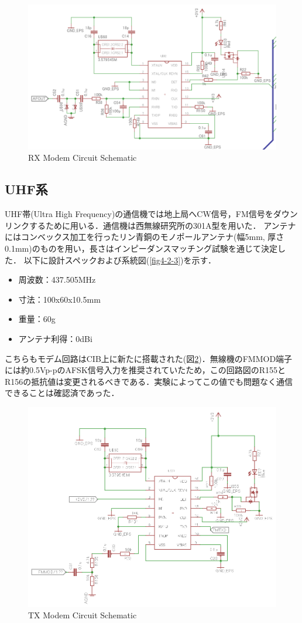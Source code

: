 \begin{figure}[htbp]
	\centering
	\includegraphics[width=0.7\linewidth]{03/fig/4-2-rx_modem.PNG}
	\caption{RX Modem Circuit Schematic}
	\label{fig4-4-2-rx_m}
\end{figure}



\subsection{UHF系}
UHF帯(Ultra High Frequency)の通信機では地上局へCW信号，FM信号をダウンリンクするために用いる．通信機は西無線研究所の301A型を用いた．
アンテナにはコンベックス加工を行ったリン青銅のモノポールアンテナ(幅5mm, 厚さ0.1mm)のものを用い，長さはインピーダンスマッチング試験を通じて決定した．
以下に設計スペックおよび系統図(\ref{fig4-2-3})を示す．
\begin{itemize}
	\item 周波数：437.505MHz
	\item 寸法：100x60x10.5mm
	\item 重量：60g
	\item アンテナ利得：0dBi
\end{itemize}




こちらもモデム回路はCIB上に新たに搭載された(図\ref{fig4-4-2-tx_m})．無線機のFMMOD端子には約0.5Vp-pのAFSK信号入力を推奨されていたため，この回路図のR155とR156の抵抗値は変更されるべきである．実験によってこの値でも問題なく通信できることは確認済であった．



\begin{figure}[htbp]
	\centering
	\includegraphics[width=0.7\linewidth]{03/fig/4-2-tx_modem.PNG}
	\caption{TX Modem Circuit Schematic}
	\label{fig4-4-2-tx_m}
\end{figure}




